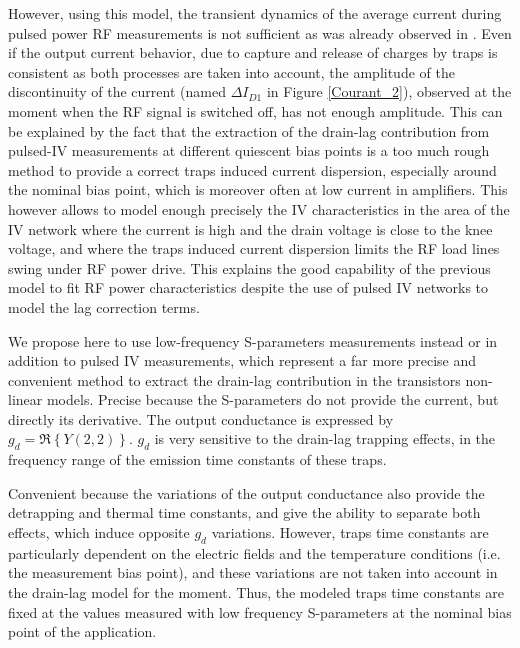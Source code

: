 \documentclass[conference]{IEEEtran}
\begin{document}
However, using this model, the transient dynamics of the average current during pulsed power RF measurements is not sufficient as was already observed in \cite{wamicon}.
Even if the output current behavior, due to capture and release of charges by traps is consistent as both processes are taken into account, the amplitude of the discontinuity of the current (named $\Delta I_{D1}$ in Figure \ref{Courant_2}), observed at the moment when the RF signal is switched off, has not enough amplitude. This can be explained by the fact that the extraction of the drain-lag contribution from pulsed-IV measurements at different quiescent bias points is a too much rough method to provide a correct traps induced current dispersion, especially around the nominal bias point, which is moreover often at low current in amplifiers. This however allows to model enough precisely the IV characteristics in the area of the IV network where the current is high and the drain voltage is close to the knee voltage, and where the traps induced current dispersion limits the RF load lines swing under RF power drive. This explains the good capability of the previous model to fit RF power characteristics despite the use of pulsed IV networks to model the lag correction terms.

We propose here to use low-frequency S-parameters measurements \cite{elrafei} instead or in addition to pulsed IV measurements, which represent a far more precise and convenient method to extract the drain-lag contribution in the transistors non-linear models. Precise because the S-parameters do not provide the current, but directly its derivative. The output conductance is expressed by $g_d=\Re \left\{Y(2,2)\right\}$. $g_d$ is very sensitive to the drain-lag trapping effects, in the frequency range of the emission time constants of these traps.

Convenient because the variations of the output conductance also provide the detrapping and thermal time constants, and give the ability to separate both effects, which induce opposite $g_d$ variations. However, traps time constants are particularly dependent on the electric fields and the temperature conditions (i.e. the measurement bias point), and these variations are not taken into account in the drain-lag model for the moment. Thus, the modeled traps time constants are fixed at the values measured with low frequency S-parameters at the nominal bias point of the application.
\end{document}
